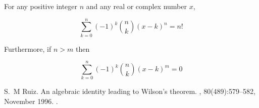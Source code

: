 \documentclass[12pt]{article}
\begin{document}
For any positive integer $n$ and any real or complex number $x$,

\[ \sum_{k=0}^{n} (-1)^k {n \choose k}(x-k)^n = n! \]

Furthermore, if $n>m$ then

\[ \sum_{k=0}^{n} (-1)^k {n \choose k}(x-k)^m = 0 \]


\begin{thebibliography}{1}

S.~M Ruiz.
\newblock An algebraic identity leading to Wilson's theorem.
, 80(489):579--582, November 1996.
\newblock {}.


\end{thebibliography}
\end{document}
